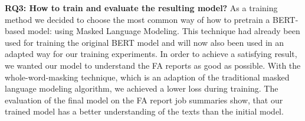 \textbf{RQ3: How to train and evaluate the resulting model?} \newline
As a training method we decided to choose the most common way of how to pretrain a BERT-based model: using Masked Language Modeling. This technique had already been used for training the original BERT model and will now also been used in an adapted way for our training experiments. In order to achieve a satisfying result, we wanted our model to understand the FA reports as good as possible. With the whole-word-masking technique, which is an adaption of the traditional masked language modeling algorithm, we achieved a lower loss during training. The evaluation of the final model on the FA report job summaries show, that our trained model has a better understanding of the texts than the initial model.